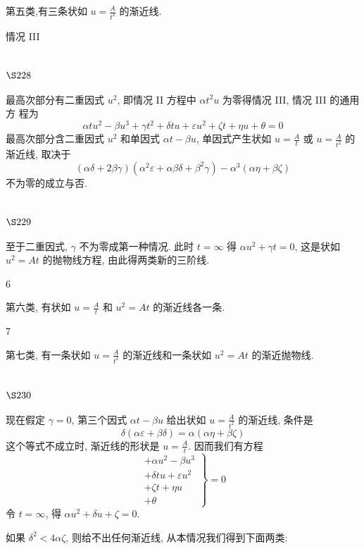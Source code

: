 第五类,有三条状如 $u=\frac{A}{t^{2}}$ 的渐近线.

情况 III

\section{$\S 228$}

最高次部分有二重因式 $u^{2}$, 即情况 II 方程中 $\alpha t^{2} u$ 为零得情况 III, 情况 III 的通用方 程为
\[
\alpha t u^{2}-\beta u^{3}+\gamma t^{2}+\delta t u+\varepsilon u^{2}+\zeta t+\eta u+\theta=0
\]
最高次部分含二重因式 $u^{2}$ 和单因式 $\alpha t-\beta u$, 单因式产生状如 $u=\frac{A}{t}$ 或 $u=\frac{A}{t^{2}}$ 的渐近线, 取决于
\[
(\alpha \delta+2 \beta \gamma)\left(\alpha^{2} \varepsilon+\alpha \beta \delta+\beta^{2} \gamma\right)-\alpha^{3}(\alpha \eta+\beta \zeta)
\]
不为零的成立与否.

\section{$\S 229$}

至于二重因式, $\gamma$ 不为零成第一种情况. 此时 $t=\infty$ 得 $\alpha u^{2}+\gamma t=0$, 这是状如 $u^{2}=A t$ 的抛物线方程, 由此得两类新的三阶线.

6

第六类, 有状如 $u=\frac{A}{t}$ 和 $u^{2}=A t$ 的渐近线各一条.

7

第七类, 有一条状如 $u=\frac{A}{t^{2}}$ 的渐近线和一条状如 $u^{2}=A t$ 的渐近抛物线.

\section{$\S 230$}

现在假定 $\gamma=0$, 第三个因式 $\alpha t-\beta u$ 给出状如 $u=\frac{A}{t^{2}}$ 的渐近线, 条件是
\[
\delta(\alpha \varepsilon+\beta \delta)=\alpha(\alpha \eta+\beta \zeta)
\]
这个等式不成立时, 渐近线的形状是 $u=\frac{A}{t}$. 因而我们有方程
\[
\left.\begin{array}{l}
+\alpha u^{2}-\beta u^{3} \\
+\delta t u+\varepsilon u^{2} \\
+\zeta t+\eta u \\
+\theta
\end{array}\right\}=0
\]
令 $t=\infty$, 得 $\alpha u^{2}+\delta u+\zeta=0$.

如果 $\delta^{2}<4 \alpha \zeta$, 则给不出任何渐近线, 从本情况我们得到下面两类:

